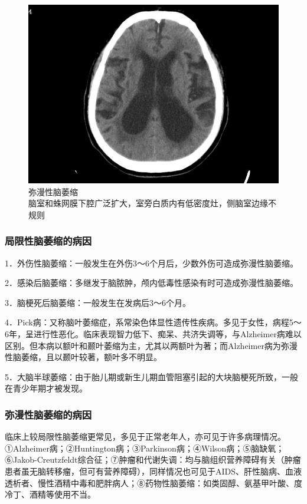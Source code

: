 \begin{figure}[!htbp]
 \centering
 \includegraphics[width=.7\textwidth,height=\textheight,keepaspectratio]{./images/Image00035.jpg}
 \captionsetup{justification=centering}
 \caption{弥漫性脑萎缩\\{\small 脑室和蛛网膜下腔广泛扩大，室旁白质内有低密度灶，侧脑室边缘不规则}}
 \label{fig2-19}
  \end{figure} 



\subsubsection{局限性脑萎缩的病因}

1．外伤性脑萎缩：一般发生在外伤3～6个月后，少数外伤可造成弥漫性脑萎缩。

2．感染后脑萎缩：多继发于脑脓肿，颅内低毒性感染有时可造成弥漫性脑萎缩。

3．脑梗死后脑萎缩：一般发生在发病后3～6个月。

4．Pick病：又称脑叶萎缩症，系常染色体显性遗传性疾病。多见于女性，病程5～6年，呈进行性恶化。临床表现智力低下、痴呆、共济失调等，与Alzheimer病难以区别。但本病以额叶和颞叶萎缩为主，尤其以两额叶为著；而Alzheimer病为弥漫性脑萎缩，且以颞叶较著，额叶多不明显。

5．大脑半球萎缩：由于胎儿期或新生儿期血管阻塞引起的大块脑梗死所致，一般在青少年期才被发现。

\subsubsection{弥漫性脑萎缩的病因}

临床上较局限性脑萎缩更常见，多见于正常老年人，亦可见于许多病理情况。①Alzheimer病；②Huntington病；③Parkinson病；④Wilson病；⑤脑缺氧；⑥Jakob-Creutzfeldt综合征；⑦肿瘤和代谢失调：均与脑组织营养障碍有关（肿瘤患者虽无脑转移瘤，但可有营养障碍），同样情况也可见于AIDS、肝性脑病、血液透析者、慢性酒精中毒和肥胖病人；⑧药物性脑萎缩：如类固醇、氨基甲叶酸、度冷丁、酒精等使用不当。

